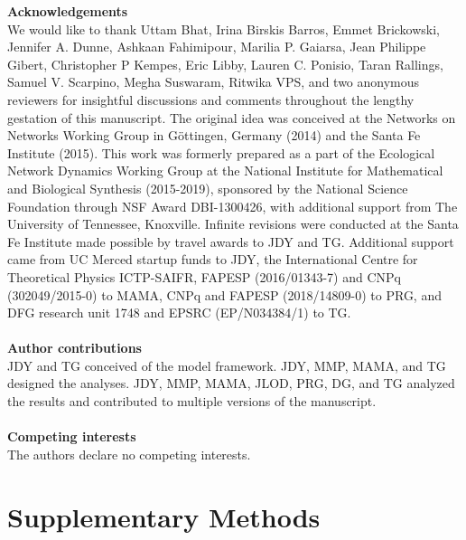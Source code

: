 \documentclass[twocolumn,preprintnumbers,amsmath,amssymb,superscriptaddress,linenumbers]{revtex4-1}
\newcommand{\beginsupplement}{%
        \clearpage
        \setcounter{table}{0}
        \renewcommand{\thetable}{S\arabic{table}}%
        \setcounter{figure}{0}
        \renewcommand{\thefigure}{S\arabic{figure}}%
        \setcounter{equation}{0}
        \renewcommand{\theequation}{S\arabic{equation}}
     }
\begin{document}
\vspace{2mm}
\noindent \textbf{Acknowledgements}\\
  \footnotesize{
  We would like to thank
  Uttam Bhat,
  Irina Birskis Barros,
  Emmet Brickowski,
  Jennifer A. Dunne,
  Ashkaan Fahimipour,
  Marilia P. Gaiarsa,
  Jean Philippe Gibert,
  Christopher P Kempes,
  Eric Libby,
  Lauren C. Ponisio,
  Taran Rallings,
  Samuel V. Scarpino,
  Megha Suswaram,
  Ritwika VPS,
  and two anonymous reviewers
  for insightful discussions and comments throughout the lengthy gestation of this manuscript.
  The original idea was conceived at the Networks on Networks Working Group in G\"ottingen, Germany (2014) and the Santa Fe Institute (2015).
  This work was formerly prepared as a part of the Ecological Network Dynamics Working Group at the National Institute for Mathematical and Biological Synthesis (2015-2019), sponsored by the National Science Foundation through NSF Award DBI-1300426, with additional support from The University of Tennessee, Knoxville.
  Infinite revisions were conducted at the Santa Fe Institute made possible by travel awards to JDY and TG.
  Additional support came from UC Merced startup funds to JDY, the International Centre for Theoretical Physics ICTP-SAIFR, FAPESP (2016/01343-7) and CNPq (302049/2015-0) to MAMA, CNPq and FAPESP (2018/14809-0) to PRG, and DFG research unit 1748 and EPSRC (EP/N034384/1) to TG.
  }\\ \\
  
\noindent \textbf{Author contributions}\\
  \footnotesize{
  JDY and TG conceived of the model framework. JDY, MMP, MAMA, and TG designed the analyses. JDY, MMP, MAMA, JLOD, PRG, DG, and TG analyzed the results and contributed to multiple versions of the manuscript.
  }\\ \\
\noindent \textbf{Competing interests}\\
  \footnotesize{
  The authors declare no competing interests.
  }
\clearpage

\clearpage


\beginsupplement


\section*{Supplementary Methods}
\end{document}
